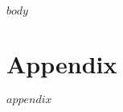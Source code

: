 \listoftables


\mainmatter                     %

% 
% 
% 
% 
% 
% 

$body$ %


\printbibliography              %

% 

\appendix
{} 
\chapter{Appendix}
$appendix$


